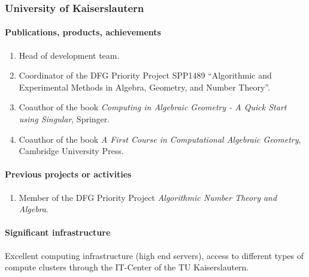 \subsubsection{University of Kaiserslautern}




\paragraph{Publications, products, achievements}

\begin{enumerate}
\item Head of {} development team.
\item Coordinator of the DFG Priority Project SPP1489 ``Algorithmic and Experimental Methods in Algebra, Geometry, and
Number Theory''.
\item Coauthor of the book \emph{Computing in Algebraic Geometry - A Quick Start using Singular}, Springer.
\item Coauthor of the book \emph{A First Course in Computational Algebraic Geometry}, 
Cambridge University Press.
\end{enumerate}

\paragraph{Previous projects or activities}

\begin{enumerate}
\item Member of the DFG Priority Project \emph{Algorithmic Number Theory and Algebra}.
\end{enumerate}

\paragraph{Significant infrastructure}

Excellent computing infrastructure (high end servers), access to 
different types of compute clusters through the IT-Center of the 
TU Kaiserslautern.


